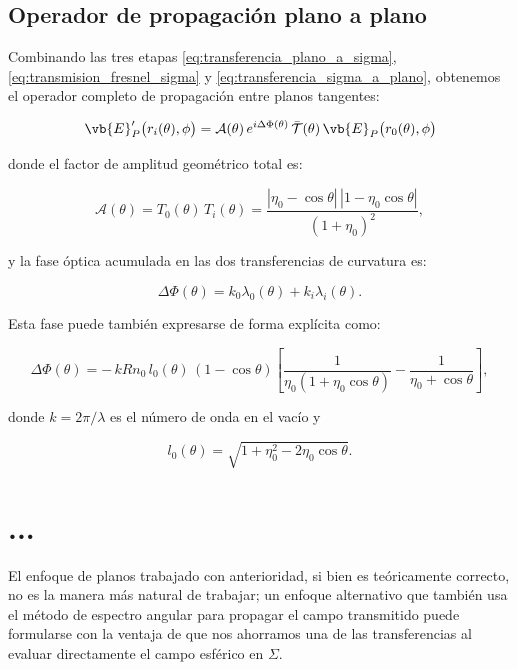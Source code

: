\subsection{Operador de propagación plano a plano}

Combinando las tres etapas \eqref{eq:transferencia_plano_a_sigma}, \eqref{eq:transmision_fresnel_sigma} y \eqref{eq:transferencia_sigma_a_plano}, obtenemos el operador completo de propagación entre planos tangentes:

\begin{equation}
\vb{E}'_P\bigl(r_i(\theta),\phi\bigr)
= \mathcal{A}(\theta)\, e^{i\Delta\Phi(\theta)}\, \mathcal{\bar{T}}(\theta)\, \vb{E}_P\bigl(r_0(\theta),\phi\bigr)
\label{eq:operador_plano_a_plano}
\end{equation}

donde el factor de amplitud geométrico total es:

\begin{equation}
\mathcal{A}(\theta) = T_0(\theta)\, T_i(\theta) = \frac{|\eta_0 - \cos\theta|\,|1 - \eta_0\cos\theta|}{(1+\eta_0)^2},
\label{eq:amplitud_geometrica_total}
\end{equation}

y la fase óptica acumulada en las dos transferencias de curvatura es:

\begin{equation}
\Delta\Phi(\theta) = k_0 \lambda_0(\theta) + k_i \lambda_i(\theta).
\label{eq:fase_optica_total}
\end{equation}

Esta fase puede también expresarse de forma explícita como:

\begin{equation}
\Delta\Phi(\theta)
=
-\,kR n_0\,l_0(\theta)\,(1-\cos\theta)
\left[
\frac{1}{\eta_0(1+\eta_0\cos\theta)}
-
\frac{1}{\eta_0+\cos\theta}
\right],
\label{eq:delta_phi_explicita}
\end{equation}

donde $k = 2\pi/\lambda$ es el número de onda en el vacío y

\begin{equation}
l_0(\theta) = \sqrt{1+\eta_0^2 - 2\eta_0\cos\theta}.
\label{eq:l0_definition_reminder}
\end{equation}


\section{...}

El enfoque de planos trabajado con anterioridad, si bien es teóricamente correcto, no es la manera más natural de trabajar; un enfoque alternativo que también usa el método de espectro angular para propagar el campo transmitido puede formularse con la ventaja de que nos ahorramos una de las transferencias al evaluar directamente el campo esférico en $\Sigma$.

